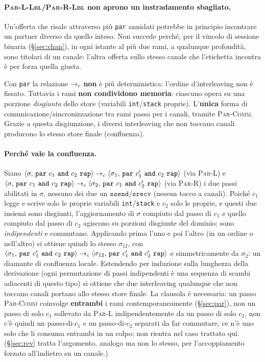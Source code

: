\paragraph{\textsc{Par-L-Lbl}/\textsc{Par-R-Lbl} non aprono un instradamento
sbagliato.} Un'offerta che risale attraverso più \texttt{par} annidati potrebbe
in principio incontrare un partner diverso da quello inteso. Non succede perché,
per il vincolo di sessione binaria (\S\ref{sec:chan}), in ogni istante al più
due rami, a qualunque profondità, sono titolari di un canale: l'altra offerta
sullo stesso canale che l'etichetta incontra è per forza quella giusta.

\medskip
\noindent
Con \texttt{par} la relazione $\toc$ \textbf{non} è più deterministica: l'ordine
d'interleaving non è fissato. Tuttavia i rami \textbf{non condividono memoria}:
ciascuno opera su una porzione \emph{disgiunta} dello store (variabili
\texttt{int}/\texttt{stack} proprie). L'\textbf{unica} forma di
comunicazione/sincronizzazione tra rami passa per i canali, tramite
\textsc{Par-Comm}. Grazie a questa disgiunzione, i diversi interleaving che non
toccano canali producono lo stesso store finale (confluenza).

\paragraph{Perché vale la confluenza.}
\label{sec:par-conf}
Siano $\cfg{\mathtt{par}\ c_1\
\mathtt{and}\ c_2\ \mathtt{rap}}{\sigma} \toc \cfg{\mathtt{par}\ c_1'\
\mathtt{and}\ c_2\ \mathtt{rap}}{\sigma_1}$ (via \textsc{Par-L}) e
$\cfg{\mathtt{par}\ c_1\ \mathtt{and}\ c_2\ \mathtt{rap}}{\sigma} \toc
\cfg{\mathtt{par}\ c_1\ \mathtt{and}\ c_2'\ \mathtt{rap}}{\sigma_2}$ (via
\textsc{Par-R}) i due passi abilitati in $\sigma$, nessuno dei due un
$\mathtt{ssend}/\mathtt{srecv}$ (nessun tocco a canali). Poiché $c_1$ legge e
scrive solo le proprie variabili \texttt{int}/\texttt{stack} e $c_2$ solo le
proprie, e questi due insiemi sono disgiunti, l'aggiornamento di $\sigma$
compiuto dal passo di $c_1$ e quello compiuto dal passo di $c_2$ agiscono su
porzioni disgiunte del dominio: sono \emph{indipendenti} e commutano.
Applicando prima l'uno e poi l'altro (in un ordine o nell'altro) si ottiene
quindi lo stesso $\sigma_{12}$, con $\cfg{\mathtt{par}\ c_1'\ \mathtt{and}\
c_2\ \mathtt{rap}}{\sigma_1} \toc \cfg{\mathtt{par}\ c_1'\ \mathtt{and}\
c_2'\ \mathtt{rap}}{\sigma_{12}}$ e simmetricamente da $\sigma_2$: un
diamante di confluenza locale. Estendendo per induzione sulla lunghezza della
derivazione (ogni permutazione di passi indipendenti è una sequenza di
scambi adiacenti di questo tipo) si ottiene che due interleaving qualunque
che non toccano canali portano allo stesso store finale. La clausola è
necessaria: un passo \textsc{Par-Comm} coinvolge \textbf{entrambi} i rami
contemporaneamente (\S\ref{sec:par}), non un passo di solo $c_1$ sollevato da
\textsc{Par-L} indipendentemente da un passo di solo $c_2$, non c'è quindi
un passo-di-$c_1$ e un passo-di-$c_2$ separati da far commutare, ce n'è uno
solo che li consuma entrambi in un colpo; non rientra nel caso trattato qui.
(\S\ref{sec:rev} tratta l'argomento, analogo ma non lo stesso, per
l'accoppiamento forzato all'indietro su un canale.)

